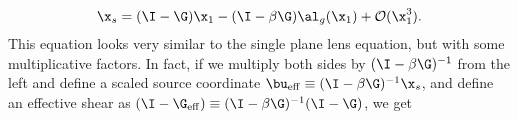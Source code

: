 \begin{equation}
\x_s = (\I - \G) \x_1  - (\I - \beta \G)\al_g(\x_1) + \mathcal{O}(\x_1^3).
\label{eq:background}
\end{equation}
This equation looks very similar to the single plane lens equation, but with some multiplicative factors. In fact, if we multiply both sides by $(\I - \beta \G)^{-1}$ from the left and define a scaled source coordinate $\bu_{\rm eff} \equiv (\I - \beta \G)^{-1} \x_s$, and define an effective shear as $(\I -\G_{\rm eff}) \equiv (\I - \beta\G)^{-1} (\I - \G)$, we get